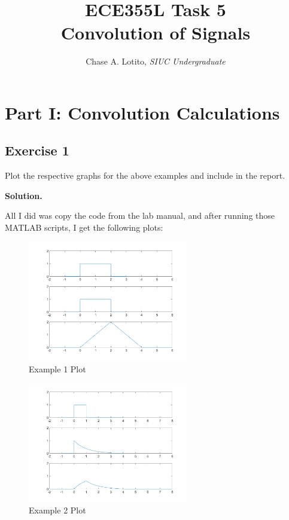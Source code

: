 \documentclass{article}
\title{\vspace{-3cm}ECE355L Task 5 \\ Convolution of Signals}
\author{Chase A. Lotito, \textit{SIUC Undergraduate}}
\date{}
\begin{document}
\pagestyle{fancy}

\fancyhead{}

\maketitle %

\section*{Part I: Convolution Calculations}

\subsection*{Exercise 1}

Plot the respective graphs for the above examples and include in the report.

\smallskip

\textbf{Solution.}

\smallskip

All I did was copy the code from the lab manual, and after running those MATLAB scripts, I get the following plots:

\begin{figure}[!ht] 
    \centering
    \includegraphics[width = 7cm]{plot1.png}
    \caption{Example 1 Plot}
    \label{fig:firstplot}
\end{figure}

\begin{figure}[!ht] 
    \centering
    \includegraphics[width = 7cm]{plot2.png}
    \caption{Example 2 Plot}
    \label{fig:secondplot}
\end{figure}
\end{document}
